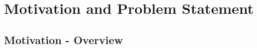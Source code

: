 %
\chapter{Motivation and Problem Statement}
\label{sec:problem-statement}

%
%
%
%
%

\section{Motivation - Overview}
\label{sec:problem-statement:overview}


%


